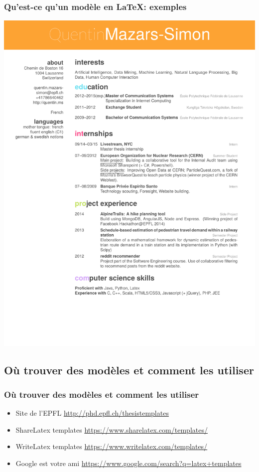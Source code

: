 \documentclass{clic_latex_beamer}
\begin{document}
\begin{frame}
\frametitle{Qu'est-ce qu'un modèle en \LaTeX: exemples}
\centering
\includegraphics[height=\textheight]{illustrations/macros/cv_exemple.pdf}
 \end{frame}
 
 \subsection{Où trouver des modèles et comment les utiliser}
 \begin{frame}
\frametitle{Où trouver des modèles et comment les utiliser}
\begin{itemize}
\item Site de l'EPFL {\small\url{http://phd.epfl.ch/thesistemplates}}
\item ShareLatex templates {\small\url{https://www.sharelatex.com/templates/}}
\item WriteLatex templates {\small\url{https://www.writelatex.com/templates/}}
\item Google est votre ami {\small\url{https://www.google.com/search?q=latex+templates}}
\end{itemize}
 \end{frame}
 
\end{document}
